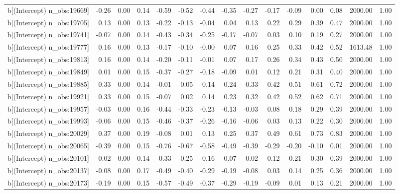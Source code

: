 \begin{table}[ht]
\begin{tabular}{rrrrrrrrrrrrrrr}
  b[(Intercept) n\_obs:19669] & -0.26 & 0.00 & 0.14 & -0.59 & -0.52 & -0.44 & -0.35 & -0.27 & -0.17 & -0.09 & 0.00 & 0.08 & 2000.00 & 1.00 \\ 
  b[(Intercept) n\_obs:19705] & 0.13 & 0.00 & 0.13 & -0.22 & -0.13 & -0.04 & 0.04 & 0.13 & 0.22 & 0.29 & 0.39 & 0.47 & 2000.00 & 1.00 \\ 
  b[(Intercept) n\_obs:19741] & -0.07 & 0.00 & 0.14 & -0.43 & -0.34 & -0.25 & -0.17 & -0.07 & 0.03 & 0.10 & 0.19 & 0.27 & 2000.00 & 1.00 \\ 
  b[(Intercept) n\_obs:19777] & 0.16 & 0.00 & 0.13 & -0.17 & -0.10 & -0.00 & 0.07 & 0.16 & 0.25 & 0.33 & 0.42 & 0.52 & 1613.48 & 1.00 \\ 
  b[(Intercept) n\_obs:19813] & 0.16 & 0.00 & 0.14 & -0.20 & -0.11 & -0.01 & 0.07 & 0.17 & 0.26 & 0.34 & 0.43 & 0.50 & 2000.00 & 1.00 \\ 
  b[(Intercept) n\_obs:19849] & 0.01 & 0.00 & 0.15 & -0.37 & -0.27 & -0.18 & -0.09 & 0.01 & 0.12 & 0.21 & 0.31 & 0.40 & 2000.00 & 1.00 \\ 
  b[(Intercept) n\_obs:19885] & 0.33 & 0.00 & 0.14 & -0.01 & 0.05 & 0.14 & 0.24 & 0.33 & 0.42 & 0.51 & 0.61 & 0.72 & 2000.00 & 1.00 \\ 
  b[(Intercept) n\_obs:19921] & 0.33 & 0.00 & 0.15 & -0.07 & 0.02 & 0.14 & 0.23 & 0.32 & 0.42 & 0.52 & 0.62 & 0.71 & 2000.00 & 1.00 \\ 
  b[(Intercept) n\_obs:19957] & -0.03 & 0.00 & 0.16 & -0.44 & -0.33 & -0.23 & -0.13 & -0.03 & 0.08 & 0.18 & 0.29 & 0.39 & 2000.00 & 1.00 \\ 
  b[(Intercept) n\_obs:19993] & -0.06 & 0.00 & 0.15 & -0.46 & -0.37 & -0.26 & -0.16 & -0.06 & 0.03 & 0.13 & 0.22 & 0.30 & 2000.00 & 1.00 \\ 
  b[(Intercept) n\_obs:20029] & 0.37 & 0.00 & 0.19 & -0.08 & 0.01 & 0.13 & 0.25 & 0.37 & 0.49 & 0.61 & 0.73 & 0.83 & 2000.00 & 1.00 \\ 
  b[(Intercept) n\_obs:20065] & -0.39 & 0.00 & 0.15 & -0.76 & -0.67 & -0.58 & -0.49 & -0.39 & -0.29 & -0.20 & -0.10 & 0.01 & 2000.00 & 1.00 \\ 
  b[(Intercept) n\_obs:20101] & 0.02 & 0.00 & 0.14 & -0.33 & -0.25 & -0.16 & -0.07 & 0.02 & 0.12 & 0.21 & 0.30 & 0.39 & 2000.00 & 1.00 \\ 
  b[(Intercept) n\_obs:20137] & -0.08 & 0.00 & 0.17 & -0.49 & -0.40 & -0.29 & -0.19 & -0.08 & 0.03 & 0.14 & 0.25 & 0.36 & 2000.00 & 1.00 \\ 
  b[(Intercept) n\_obs:20173] & -0.19 & 0.00 & 0.15 & -0.57 & -0.49 & -0.37 & -0.29 & -0.19 & -0.09 & 0.01 & 0.13 & 0.21 & 2000.00 & 1.00 \\ 

\end{tabular}
\end{table}

